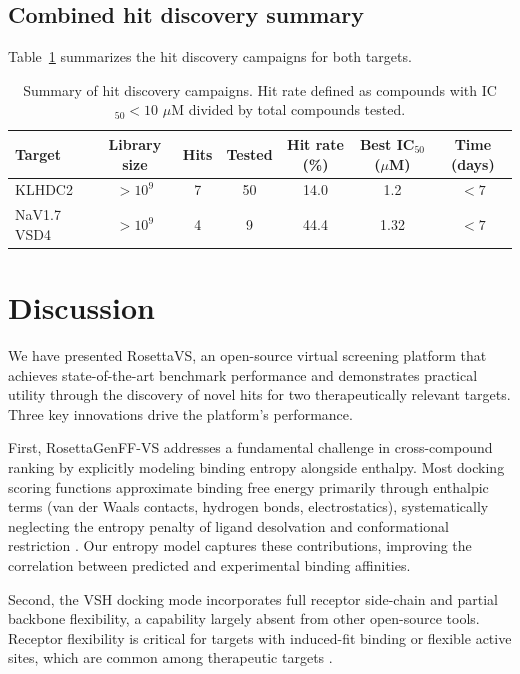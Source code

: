 \documentclass[11pt]{article}
\begin{document}
\subsection{Combined hit discovery summary}

Table~\ref{tab:combined} summarizes the hit discovery campaigns for both targets.

\begin{table}[H]
\centering
\caption{Summary of hit discovery campaigns. Hit rate defined as compounds with IC$_{50} < 10$ $\mu$M divided by total compounds tested.}
\label{tab:combined}
\begin{tabular}{lcccccc}
\toprule
\textbf{Target} & \textbf{Library size} & \textbf{Hits} & \textbf{Tested} & \textbf{Hit rate (\%)} & \textbf{Best IC$_{50}$ ($\mu$M)} & \textbf{Time (days)} \\
\midrule
KLHDC2 & $>10^9$ & 7 & 50 & 14.0 & 1.2 & $< 7$ \\
NaV1.7 VSD4 & $>10^9$ & 4 & 9 & 44.4 & 1.32 & $< 7$ \\
\bottomrule
\end{tabular}
\end{table}

\section{Discussion}

We have presented RosettaVS, an open-source virtual screening platform that achieves state-of-the-art benchmark performance and demonstrates practical utility through the discovery of novel hits for two therapeutically relevant targets. Three key innovations drive the platform's performance.

First, RosettaGenFF-VS addresses a fundamental challenge in cross-compound ranking by explicitly modeling binding entropy alongside enthalpy. Most docking scoring functions approximate binding free energy primarily through enthalpic terms (van der Waals contacts, hydrogen bonds, electrostatics), systematically neglecting the entropy penalty of ligand desolvation and conformational restriction \citep{wang2004, ballester2010}. Our entropy model captures these contributions, improving the correlation between predicted and experimental binding affinities.

Second, the VSH docking mode incorporates full receptor side-chain and partial backbone flexibility, a capability largely absent from other open-source tools. Receptor flexibility is critical for targets with induced-fit binding or flexible active sites, which are common among therapeutic targets \citep{kitchen2004}.
\end{document}
